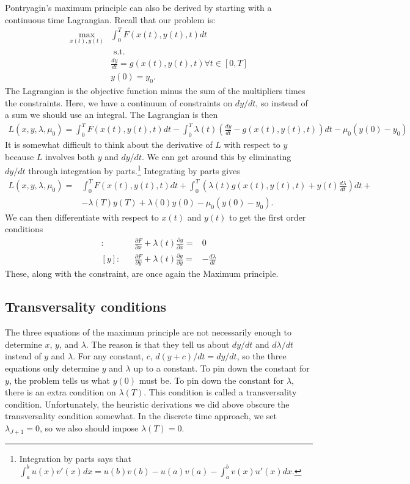 Pontryagin's maximum principle can also be derived by starting with a
continuous time Lagrangian. Recall that our problem is:
\begin{align*}
  \max_{x(t),y(t)} & \int_0^T F(x(t),y(t),t) dt \\
  & \text{ s.t.} \\
  & \frac{d y}{dt} = g(x(t),y(t),t) \forall t \in [0,T] \\ 
  & y(0) = y_0.
\end{align*}
The Lagrangian is the objective function minus the sum of the
multipliers times the constraints. Here, we have a continuum of
constraints on $dy/dt$, so instead of a sum we should use an
integral. The Lagrangian is then 
\begin{align*}
  L(x,y,\lambda,\mu_0) = \int_0^T F(x(t),y(t),t) dt - \int_0^T
  \lambda(t)\left( \frac{dy}{dt} - g(x(t),y(t),t) \right) dt - \mu_0
  (y(0) - y_0) 
\end{align*}
It is somewhat difficult to think about the derivative of $L$ with
respect to $y$ because $L$ involves both $y$ and $dy/dt$. We can get
around this by eliminating $dy/dt$ through integration by
parts.\footnote{Integration by parts says that $\int_a^b u(x) v'(x) dx
  = u(b)v(b) - u(a)v(a) - \int_a^b v(x) u'(x) dx$.} Integrating by
parts gives
\begin{align*}
  L(x,y,\lambda,\mu_0) = & \int_0^T F(x(t),y(t),t) dt +\int_0^T  \left(  
    \lambda(t) g(x(t),y(t),t) + y(t) \frac{d\lambda}{dt}\right)dt +
  \\ & -\lambda(T) y(T) + \lambda(0) y(0) - \mu_0
  (y(0) - y_0).
\end{align*} 
We can then differentiate with respect to $x(t)$ and $y(t)$ to get the
first order conditions
\begin{align*}
  [x]: && \frac{\partial F}{\partial x} + \lambda(t) \frac{\partial
    g}{\partial x} = &  0 \\
  [y]: && \frac{\partial F}{\partial y} + \lambda(t) \frac{\partial
    g}{\partial y} = &  -\frac{d\lambda}{dt}  
\end{align*}
These, along with the constraint, are once again the Maximum
principle. 

\subsection{Transversality conditions}

The three equations of the maximum principle are not necessarily
enough to determine $x$, $y$, and $\lambda$. The reason is that they
tell us about $dy/dt$ and $d\lambda/dt$ instead of $y$ and
$\lambda$. For any constant, $c$, $d(y+c)/dt = dy/dt$, so the three
equations only determine $y$ and $\lambda$ up to a constant. To pin
down the constant for $y$, the problem tells us what $y(0)$ must
be. To pin down the constant for $\lambda$, there is an extra
condition on $\lambda(T)$. This condition is called a transversality
condition. Unfortunately, the heuristic derivations we did above
obscure the transversality condition somewhat. In the discrete time
approach, we set $\lambda_{J+1} =0$, so we also should impose
$\lambda(T) = 0$. 

